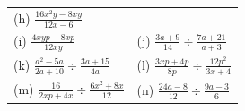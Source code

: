 \begin{enumerate}[noitemsep, label=\textbf{\arabic*}. ]
{{\begin{center}
\begin{xtabular}[t]{|l|l|}
        (h) $\frac{16{x}^{2}y-8xy}{12x-6}$\hspace{1ex}%
     \tabularnewline{}
        (i) $\frac{4xyp-8xp}{12xy}$\hspace{1ex} &
        (j) $\frac{3a+9}{14}÷\frac{7a+21}{a+3}$\hspace{1ex}%
     \tabularnewline{}
        (k) $\frac{{a}^{2}-5a}{2a+10}÷\frac{3a+15}{4a}$\hspace{1ex} &
        (l) $\frac{3xp+4p}{8p}÷\frac{12{p}^{2}}{3x+4}$\hspace{1ex}%
     \tabularnewline{}
        (m) $\frac{16}{2xp+4x}÷\frac{6{x}^{2}+8x}{12}$\hspace{1ex} &
        (n) $\frac{24a-8}{12}÷\frac{9a-3}{6}$\hspace{1ex}%
     \tabularnewline{}

\end{xtabular}
\end{center}}}
\end{enumerate}
